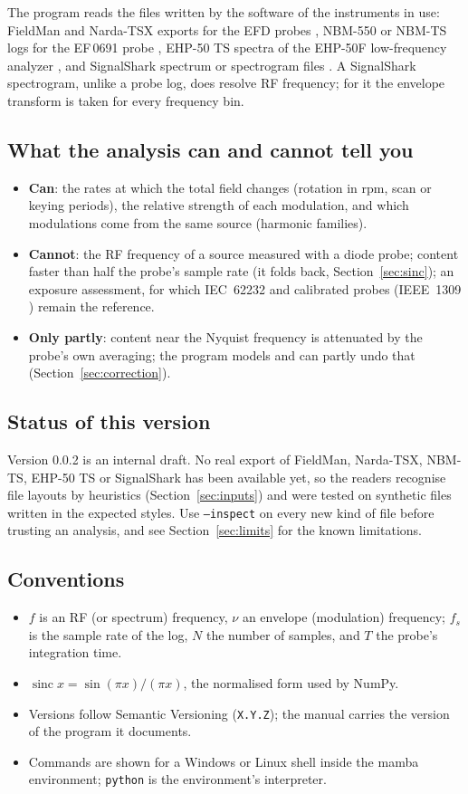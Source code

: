 \documentclass[10pt,letterpaper]{article}
\numberwithin{equation}{section}
\DeclareMathOperator{\sinc}{sinc}
\begin{document}
The program reads the files written by the software of the instruments in use:
FieldMan and Narda-TSX exports for the EFD probes \cite{R5,R9}, NBM-550 or
NBM-TS logs for the EF\,0691 probe \cite{R6}, EHP-50 TS spectra of the EHP-50F
low-frequency analyzer \cite{R7}, and SignalShark spectrum or spectrogram files
\cite{R8}. A SignalShark spectrogram, unlike a probe log, does resolve RF
frequency; for it the envelope transform is taken for every frequency bin.

\subsection{What the analysis can and cannot tell you}
\begin{itemize}
\item \textbf{Can}: the rates at which the total field changes (rotation in rpm,
scan or keying periods), the relative strength of each modulation, and which
modulations come from the same source (harmonic families).
\item \textbf{Cannot}: the RF frequency of a source measured with a diode probe;
content faster than half the probe's sample rate (it folds back, Section~\ref{sec:sinc});
an exposure assessment, for which IEC~62232 \cite{R18} and calibrated probes
(IEEE~1309 \cite{R17}) remain the reference.
\item \textbf{Only partly}: content near the Nyquist frequency is attenuated by
the probe's own averaging; the program models and can partly undo that
(Section~\ref{sec:correction}).
\end{itemize}

\subsection{Status of this version}
Version 0.0.2 is an internal draft. No real export of FieldMan,
Narda-TSX, NBM-TS, EHP-50 TS or SignalShark has been available yet, so the
readers recognise file layouts by heuristics (Section~\ref{sec:inputs}) and
were tested on synthetic files written in the expected styles. Use
\texttt{--inspect} on every new kind of file before trusting an analysis, and
see Section~\ref{sec:limits} for the known limitations.

\subsection{Conventions}
\begin{itemize}
\item $f$ is an RF (or spectrum) frequency, $\nu$ an envelope (modulation)
frequency; $f_s$ is the sample rate of the log, $N$ the number of samples, and
$T$ the probe's integration time.
\item $\sinc x = \sin(\pi x)/(\pi x)$, the normalised form used by NumPy.
\item Versions follow Semantic Versioning (\texttt{X.Y.Z}); the manual carries
the version of the program it documents.
\item Commands are shown for a Windows or Linux shell inside the mamba
environment; \texttt{python} is the environment's interpreter.
\end{itemize}
\end{document}
